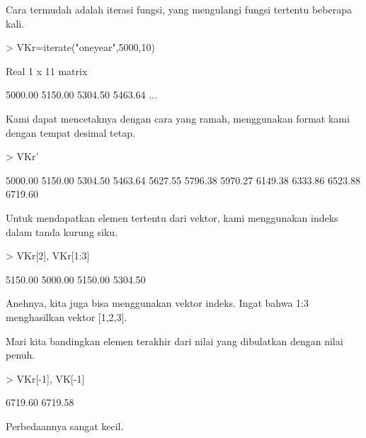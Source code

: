 \documentclass[a4paper,10pt]{article}
\begin{document}
\begin{eulernotebook}
\begin{eulercomment}
\begin{eulercomment}
\begin{eulercomment}
\begin{eulercomment}
\begin{eulercomment}
\begin{eulercomment}
\begin{eulercomment}
\begin{eulercomment}
\begin{eulercomment}
\begin{eulercomment}
\begin{eulercomment}
Cara termudah adalah iterasi fungsi, yang mengulangi fungsi tertentu
beberapa kali.
\end{eulercomment}
\begin{eulerprompt}
> VKr=iterate("oneyear",5000,10)
\end{eulerprompt}
\begin{euleroutput}
  Real 1 x 11 matrix
  
      5000.00     5150.00     5304.50     5463.64     ...
\end{euleroutput}
\begin{eulercomment}
Kami dapat mencetaknya dengan cara yang ramah, menggunakan format kami
dengan tempat desimal tetap.
\end{eulercomment}
\begin{eulerprompt}
> VKr'
\end{eulerprompt}
\begin{euleroutput}
      5000.00 
      5150.00 
      5304.50 
      5463.64 
      5627.55 
      5796.38 
      5970.27 
      6149.38 
      6333.86 
      6523.88 
      6719.60 
\end{euleroutput}
\begin{eulercomment}
Untuk mendapatkan elemen tertentu dari vektor, kami menggunakan indeks
dalam tanda kurung siku.
\end{eulercomment}
\begin{eulerprompt}
> VKr[2], VKr[1:3]
\end{eulerprompt}
\begin{euleroutput}
      5150.00 
      5000.00     5150.00     5304.50 
\end{euleroutput}
\begin{eulercomment}
Anehnya, kita juga bisa menggunakan vektor indeks. Ingat bahwa 1:3
menghasilkan vektor [1,2,3].

Mari kita bandingkan elemen terakhir dari nilai yang dibulatkan dengan
nilai penuh.
\end{eulercomment}
\begin{eulerprompt}
> VKr[-1], VK[-1]
\end{eulerprompt}
\begin{euleroutput}
      6719.60 
      6719.58 
\end{euleroutput}
\begin{eulercomment}
Perbedaannya sangat kecil.


\end{eulercomment}
\end{eulercomment}
\end{eulercomment}
\end{eulercomment}
\end{eulercomment}
\end{eulercomment}
\end{eulercomment}
\end{eulercomment}
\end{eulercomment}
\end{eulercomment}
\end{eulercomment}
\end{eulernotebook}
\end{document}
